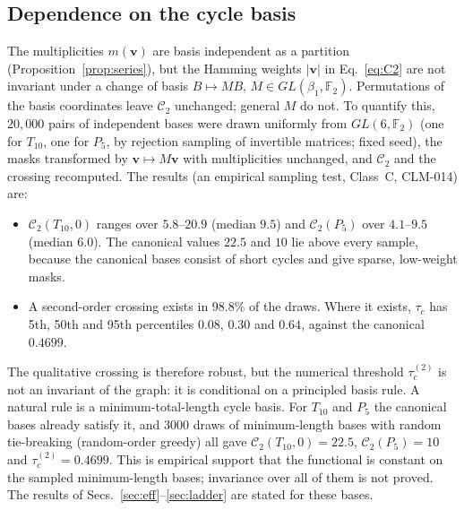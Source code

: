 \documentclass[10pt,twocolumn]{article}
\theoremstyle{definition}
\newcommand{\Tten}{T_{10}}
\newcommand{\Pfive}{P_5}
\newcommand{\F}{\mathbb{F}_2}
\newcommand{\tauc}{\tau_c^{(2)}}
\begin{document}
\subsection{Dependence on the cycle basis}\label{sec:basisdep}
The multiplicities $m(\mathbf v)$ are basis independent as a partition (Proposition~\ref{prop:series}), but the Hamming weights $|\mathbf v|$ in Eq.~\eqref{eq:C2} are not invariant under a change of basis $B\mapsto MB$, $M\in GL(\beta_1,\F)$. Permutations of the basis coordinates leave $\mathcal C_2$ unchanged; general $M$ do not. To quantify this, $20{,}000$ pairs of independent bases were drawn uniformly from $GL(6,\F)$ (one for $\Tten$, one for $\Pfive$, by rejection sampling of invertible matrices; fixed seed), the masks transformed by $\mathbf v\mapsto M\mathbf v$ with multiplicities unchanged, and $\mathcal C_2$ and the crossing recomputed. The results (an empirical sampling test, Class~C, CLM-014) are:
\begin{itemize}\setlength{\itemsep}{0pt}
\item $\mathcal C_2(\Tten,0)$ ranges over $5.8$--$20.9$ (median $9.5$) and $\mathcal C_2(\Pfive)$ over $4.1$--$9.5$ (median $6.0$). The canonical values $22.5$ and $10$ lie above every sample, because the canonical bases consist of short cycles and give sparse, low-weight masks.
\item A second-order crossing exists in $98.8\%$ of the draws. Where it exists, $\tau_c$ has 5th, 50th and 95th percentiles $0.08$, $0.30$ and $0.64$, against the canonical $0.4699$.
\end{itemize}
The qualitative crossing is therefore robust, but the numerical threshold $\tauc$ is not an invariant of the graph: it is conditional on a principled basis rule. A natural rule is a minimum-total-length cycle basis. For $\Tten$ and $\Pfive$ the canonical bases already satisfy it, and $3000$ draws of minimum-length bases with random tie-breaking (random-order greedy) all gave $\mathcal C_2(\Tten,0)=22.5$, $\mathcal C_2(\Pfive)=10$ and $\tau_c^{(2)}=0.4699$. This is empirical support that the functional is constant on the sampled minimum-length bases; invariance over all of them is not proved. The results of Secs.~\ref{sec:eff}--\ref{sec:ladder} are stated for these bases.

\end{document}

